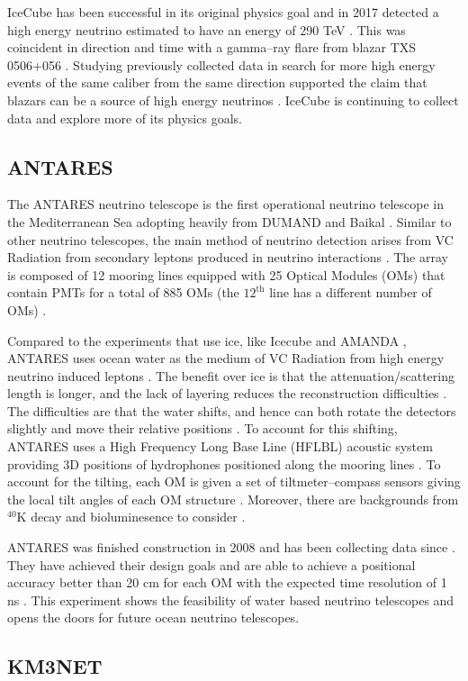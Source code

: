 IceCube has been successful in its original physics goal \cite{icecube} and in 2017 detected a high energy neutrino estimated to have an energy of 290 TeV \cite{icecube_nat}. This was coincident in direction and time with a gamma--ray flare from blazar TXS 0506+056 \cite{icecube_nat}. Studying previously collected data in search for more high energy events of the same caliber from the same direction supported the claim that blazars can be a source of high energy neutrinos \cite{icecube_nat}. IceCube is continuing to collect data and explore more of its physics goals.

\subsection{ANTARES}

The ANTARES neutrino telescope is the first operational neutrino telescope in the Mediterranean Sea \cite{antares} adopting heavily from DUMAND \cite{dumand} and Baikal \cite{baikal}. Similar to other neutrino telescopes, the main method of neutrino detection arises from VC Radiation from secondary leptons produced in neutrino interactions \cite{antares}. The array is composed of 12 mooring lines equipped with 25 Optical Modules (OMs) that contain PMTs for a total of 885 OMs (the $12^{\text{th}}$ line has a different number of OMs) \cite{antares}.

Compared to the experiments that use ice, like Icecube \cite{icecube, icecube_nat, icecube_rad} and AMANDA \cite{amanda}, ANTARES uses ocean water as the medium of VC Radiation from high energy neutrino induced leptons \cite{antares}. The benefit over ice is that the attenuation/scattering length is longer, and the lack of layering reduces the reconstruction difficulties \cite{antares, icecube_rad}. The difficulties are that the water shifts, and hence can both rotate the detectors slightly and move their relative positions \cite{antares, icecube_rad}. To account for this shifting, ANTARES uses a High Frequency Long Base Line (HFLBL) acoustic system providing 3D positions of hydrophones positioned along the mooring lines \cite{antares}. To account for the tilting, each OM is given a set of tiltmeter--compass sensors giving the local tilt angles of each OM structure \cite{antares}. Moreover, there are backgrounds from $^{40}$K decay and bioluminesence to consider \cite{icecube_rad}.

ANTARES was finished construction in 2008 and has been collecting data since \cite{antares}. They have achieved their design goals and are able to achieve a positional accuracy better than 20 cm for each OM with the expected time resolution of 1 ns \cite{antares}. This experiment shows the feasibility of water based neutrino telescopes and opens the doors for future ocean neutrino telescopes. 

\subsection{KM3NET}
